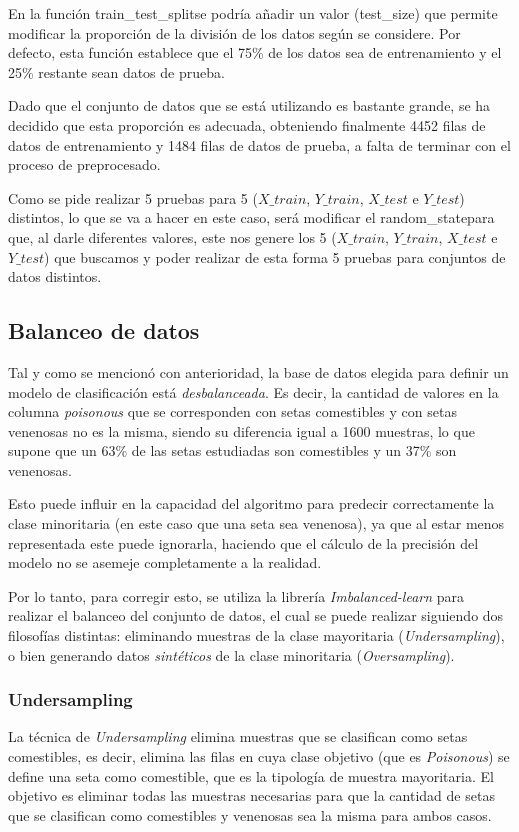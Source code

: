 \documentclass{Plantilla/Formato_EPEF}
\begin{document}
En la función \textgravedbl train\_test\_split\textacutedbl se podría añadir un valor (\textgravedbl test\_size\textacutedbl) que permite modificar la proporción de la división de los datos según se considere. Por defecto, esta función establece que el 75\% de los datos sea de entrenamiento y el 25\% restante sean datos de prueba. 

Dado que el conjunto de datos que se está utilizando es bastante grande, se ha decidido que esta proporción es adecuada, obteniendo finalmente 4452 filas de datos de entrenamiento y 1484 filas de datos de prueba, a falta de terminar con el proceso de preprocesado.

Como se pide realizar 5 pruebas para 5 ($X\_train$, $Y\_train$, $X\_test$ e $Y\_test$) distintos, lo que se va a hacer en este caso, será modificar el \textgravedbl random\_state\textacutedbl para que, al darle diferentes valores, este nos genere los 5 ($X\_train$, $Y\_train$, $X\_test$ e $Y\_test$) que buscamos y poder realizar de esta forma 5 pruebas para conjuntos de datos distintos.


\subsection{Balanceo de datos}
Tal y como se mencionó con anterioridad, la base de datos elegida para definir un modelo de clasificación está \textit{desbalanceada}. Es decir, la cantidad de valores en la columna \textit{poisonous} que se corresponden con setas comestibles y con setas venenosas no es la misma, siendo su diferencia igual a 1600 muestras, lo que supone que un 63\% de las setas estudiadas son comestibles y un 37\% son venenosas.

Esto puede influir en la capacidad del algoritmo para predecir correctamente la clase minoritaria (en este caso que una seta sea venenosa), ya que al estar menos representada este puede ignorarla, haciendo que el cálculo de la precisión del modelo no se asemeje completamente a la realidad.

Por lo tanto, para corregir esto, se utiliza la librería \textit{Imbalanced-learn} para realizar el balanceo del conjunto de datos, el cual se puede realizar siguiendo dos filosofías distintas: eliminando muestras de la clase mayoritaria (\textit{Undersampling}), o bien generando datos \textit{sintéticos} de la clase minoritaria (\textit{Oversampling}).

\subsubsection{Undersampling}
La técnica de \textit{Undersampling} elimina muestras que se clasifican como setas comestibles, es decir, elimina las filas en cuya clase objetivo (que es \textit{Poisonous}) se define una seta como comestible, que es la tipología de muestra mayoritaria. El objetivo es eliminar todas las muestras necesarias para que la cantidad de setas que se clasifican como comestibles y venenosas sea la misma para ambos casos.
\end{document}

